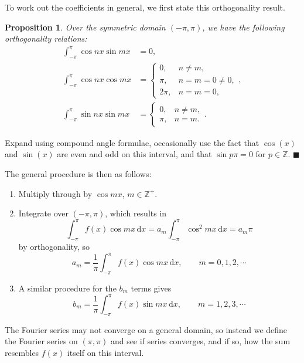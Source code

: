 \documentclass[letter-paper]{tufte-book}
\newtheorem{proposition}[theorem]{\color{pastel-blue}Proposition}
\newenvironment{proof}[1][Proof]{\begin{trivlist}
\item[\hskip \labelsep {\bfseries #1}]}{\end{trivlist}}
\newcommand{\qed}{\hfill$\blacksquare$}
\begin{document}
To work out the coefficients in general, we first state this orthogonality
result.
\begin{proposition}
  Over the symmetric domain $(-\pi,\pi)$, we have the following orthogonality
  relations:
  \begin{align*}
    \int_{-\pi}^\pi \cos nx\sin mx &= 0,\\
    \int_{-\pi}^\pi \cos nx\cos mx &= \begin{cases} 
      0, & n\neq m,\\ \pi, & n=m=0\neq0,\\ 2\pi, & n=m=0, \end{cases}, \\
    \int_{-\pi}^\pi \sin nx\sin mx &= \begin{cases}
      0, & n\neq m,\\ \pi, & n=m. \end{cases}.
  \end{align*}
\end{proposition}
\begin{proof}
  Expand using compound angle formulae, occasionally use the fact that $\cos(x)$
  and $\sin(x)$ are even and odd on this interval, and that $\sin p\pi=0$ for
  $p\in\mathbb{Z}$. \qed
\end{proof}

The general procedure is then as follows:
\begin{enumerate}
  \item Multiply through by $\cos mx$, $m\in\mathbb{Z}^+$.
  \item Integrate over $(-\pi,\pi)$, which results in
  \begin{equation*}
    \int_{-\pi}^\pi f(x)\cos mx\, \mathrm{d}x = 
    a_m\int_{-\pi}^\pi \cos^2 mx\, \mathrm{d}x = a_m \pi    
  \end{equation*}
  by orthogonality, so
  \begin{equation*}
    a_m = \frac{1}{\pi}\int_{-\pi}^\pi f(x)\cos mx\, \mathrm{d}x,\qquad
    m=0,1,2,\cdots
  \end{equation*}
  \item A similar procedure for the $b_m$ terms gives
  \begin{equation*}
    b_m = \frac{1}{\pi}\int_{-\pi}^\pi f(x)\sin mx\, \mathrm{d}x,\qquad
    m=1,2,3,\cdots
  \end{equation*}
\end{enumerate}
The Fourier series may not converge on a general domain, so instead we define
the Fourier series on $(\pi,\pi)$ and see if series converges, and if so, how
the sum resembles $f(x)$ itself on this interval.
\end{document}

